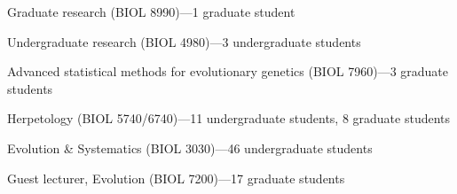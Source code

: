 \begin{tightItemize}
    \item Graduate research (BIOL 8990)---1 graduate student
    \item Undergraduate research (BIOL 4980)---3 undergraduate students
    \item Advanced statistical methods for evolutionary genetics (BIOL 7960)---3 graduate students
    \item Herpetology (BIOL 5740/6740)---11 undergraduate students, 8 graduate students
    \item Evolution \& Systematics (BIOL 3030)---46 undergraduate students
    \item Guest lecturer, Evolution (BIOL 7200)---17 graduate students
\end{tightItemize}
